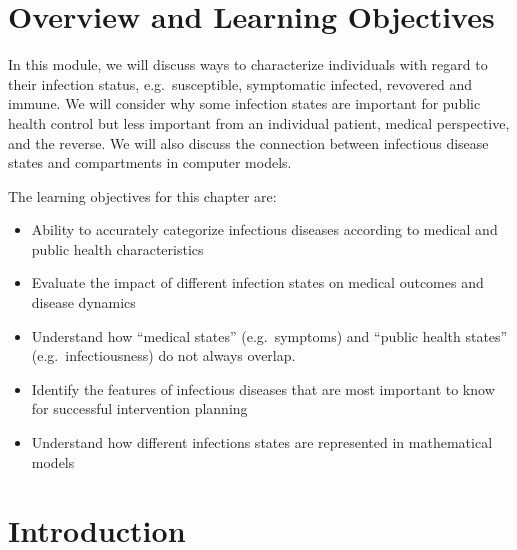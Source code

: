 \documentclass[
]{book}
\providecommand{\tightlist}{%
  \setlength{\itemsep}{0pt}\setlength{\parskip}{0pt}}
\begin{document}
\hypertarget{overview-and-learning-objectives-1}{%
\section{Overview and Learning Objectives}\label{overview-and-learning-objectives-1}}

In this module, we will discuss ways to characterize individuals with regard to their infection status, e.g.~susceptible, symptomatic infected, revovered and immune. We will consider why some infection states are important for public health control but less important from an individual patient, medical perspective, and the reverse. We will also discuss the connection between infectious disease states and compartments in computer models.

The learning objectives for this chapter are:

\begin{itemize}
\tightlist
\item
  Ability to accurately categorize infectious diseases according to medical and public health characteristics
\item
  Evaluate the impact of different infection states on medical outcomes and disease dynamics
\item
  Understand how ``medical states'' (e.g.~symptoms) and ``public health states'' (e.g.~infectiousness) do not always overlap.
\item
  Identify the features of infectious diseases that are most important to know for successful intervention planning
\item
  Understand how different infections states are represented in mathematical models
\end{itemize}

\hypertarget{introduction-1}{%
\section{Introduction}\label{introduction-1}}
\end{document}
